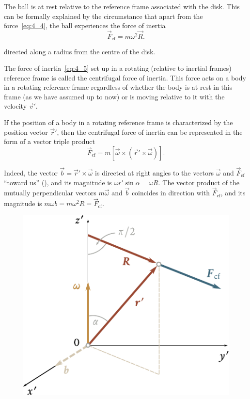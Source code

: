 The ball is at rest relative to the reference frame associated with the disk. This can be formally explained by the circumstance that apart from the force~\eqref{eq:4_4}, the ball experiences the force of inertia
\begin{equation}\label{eq:4_5}
\vec{F}_{\text{cf}} = m\omega^2\vec{R}.
\end{equation}

\noindent
directed along a radius from the centre of the disk.

The force of inertia~\eqref{eq:4_5} set up in a rotating (relative to inertial frames) reference frame is called the centrifugal force of inertia. This force acts on a body in a rotating reference frame regardless of whether the body is at rest in this frame (as we have assumed up to now) or is moving relative to it with the velocity $\vec{v}'$.

If the position of a body in a rotating reference frame is characterized by the position vector $\vec{r}'$, then the centrifugal force of inertia can be represented in the form of a vector triple product
\begin{equation}\label{eq:4_6}
\vec{F}_{\text{cf}} = m [\vec{\omega} \times (\vec{r}'\times\vec{\omega})].
\end{equation}

\noindent
Indeed, the vector $\vec{b}=\vec{r}'\times\vec{\omega}$ is directed at right angles to the vectors $\vec{\omega}$ and $\vec{F}_{\text{cf}}$ ``toward us'' (), and its magnitude is $\omega r'\sin\alpha=\omega R$. The vector product of the mutually perpendicular vectors $m\vec{\omega}$ and $\vec{b}$ coincides in direction with $\vec{F}_{\text{cf}}$, and its magnitude is $m\omega b=m\omega^2R=\vec{F}_{\text{cf}}$.

\begin{figure}[t]
	\begin{center}
		\includegraphics[scale=1]{figures/ch_04/fig_4_4.pdf}
		\caption[]{}
		\label{fig:4_4}
	\end{center}
\end{figure}

